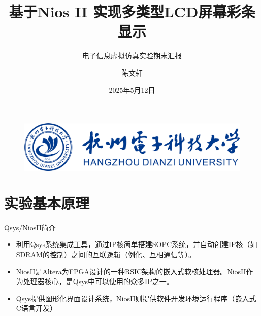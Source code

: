 \documentclass{beamer}
\author{陈文轩}
\title{基于Nios II 实现多类型LCD屏幕彩条显示}
\subtitle{电子信息虚拟仿真实验期末汇报}
\institute{杭州电子科技大学卓越学院}
\date{2025年5月12日}
\begin{document}
	
	\kaishu
	\begin{frame}
		\titlepage
		\begin{figure}[htpb]
			\begin{center}
				\includegraphics[width=0.35\linewidth]{pic/HDUlogo.pdf}
			\end{center}
		\end{figure}
	\end{frame}
	
	\begin{frame}
		\tableofcontents[sectionstyle=show,subsectionstyle=show/shaded/hide,subsubsectionstyle=show/shaded/hide]
	\end{frame}
	
	
	
\section{实验基本原理}
	
	
	
\begin{frame}{Qsys/NiosII简介}
    \begin{itemize}[<+-| alert@+>]
    \item 利用Qsys系统集成工具，通过IP核简单搭建SOPC系统，并自动创建IP核（如SDRAM的控制）之间的互联逻辑（例化、互相通信等）。

    \item NiosII是Altera为FPGA设计的一种RSIC架构的嵌入式软核处理器。NiosII作为处理器核心，是Qsys中可以使用的众多IP之一。

    \item Qsys提供图形化界面设计系统，NiosII则提供软件开发环境运行程序（嵌入式C语言开发）
     \end{itemize}
\end{frame}
\end{document}
